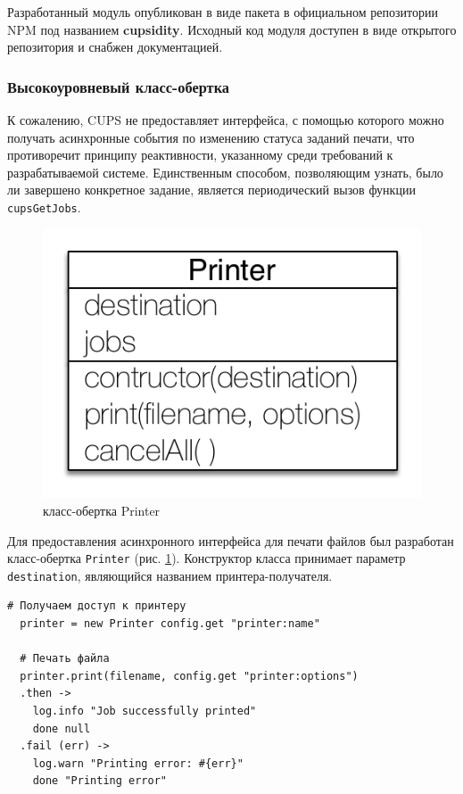 \documentclass[a4paper,14pt,href]{article}
\begin{document}
Разработанный модуль опубликован в виде пакета в официальном репозитории NPM под названием \textbf{cupsidity}. Исходный
код модуля доступен в виде открытого репозитория и снабжен документацией\cite{Cupsidity}.

\subsubsection{Высокоуровневый класс-обертка}
К сожалению, CUPS не предоставляет интерфейса, с помощью которого можно получать асинхронные события по изменению
статуса заданий печати, что противоречит принципу реактивности, указанному среди требований к разрабатываемой системе.
Единственным способом, позволяющим узнать, было ли завершено конкретное задание, является периодический вызов функции
\texttt{cupsGetJobs}.

\begin{figure}[htbp]
\begin{center}
  \includegraphics[scale=0.8]{printer-class.pdf}
    \caption{класс-обертка Printer}
    \label{fig:PrinterClass}
\end{center}
\end{figure}

Для предоставления асинхронного интерфейса для печати файлов был разработан класс-обертка \texttt{Printer} (рис.
\ref{fig:PrinterClass}). Конструктор класса принимает параметр \texttt{destination}, являющийся названием
принтера-получателя.


\begin{lstlisting}[caption=Печать файла с помощью класса \texttt{Printer}, label=lst:deferred]
  # Получаем доступ к принтеру
  printer = new Printer config.get "printer:name"

  # Печать файла
  printer.print(filename, config.get "printer:options")
  .then ->
    log.info "Job successfully printed"
    done null
  .fail (err) ->
    log.warn "Printing error: #{err}"
    done "Printing error"
\end{lstlisting}
\end{document}
